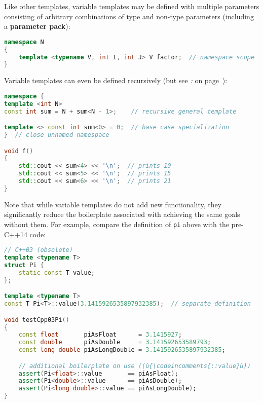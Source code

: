 \noindent Like other templates, variable templates may be defined with multiple
parameters consisting of arbitrary combinations of type and non-type
parameters (including a \textbf{parameter pack}):

\begin{lstlisting}[language=C++]
namespace N
{
    template <typename V, int I, int J> V factor;  // namespace scope
}
\end{lstlisting}

\noindent Variable templates can even be defined recursively (but see
{\it{}:} {\it{}} on page~\pageref{recursive-variable-template-initializations-require-const-or-constexpr}):

\begin{lstlisting}[language=C++]
namespace {
template <int N>
const int sum = N + sum<N - 1>;    // recursive general template

template <> const int sum<0> = 0;  // base case specialization
}  // close unnamed namespace

void f()
{
    std::cout << sum<4> << '\n';  // prints 10
    std::cout << sum<5> << '\n';  // prints 15
    std::cout << sum<6> << '\n';  // prints 21
}
\end{lstlisting}

\noindent Note that while variable templates do not add new functionality, they significantly reduce the boilerplate associated with achieving the same goals without them.  For example, compare the definition of \lstinline!pi! above with the pre-C++14 code:

\begin{lstlisting}[language=C++]
// C++03 (obsolete)
template <typename T>
struct Pi {
    static const T value;
};

template <typename T>
const T Pi<T>::value(3.1415926535897932385);  // separate definition

void testCpp03Pi()
{
    const float       piAsFloat      = 3.1415927;
    const double      piAsDouble     = 3.141592653589793;
    const long double piAsLongDouble = 3.1415926535897932385;

    // additional boilerplate on use ((ù{\codeincomments{::value}ù))
    assert(Pi<float>::value       == piAsFloat);
    assert(Pi<double>::value      == piAsDouble);
    assert(Pi<long double>::value == piAsLongDouble);
}
\end{lstlisting}

